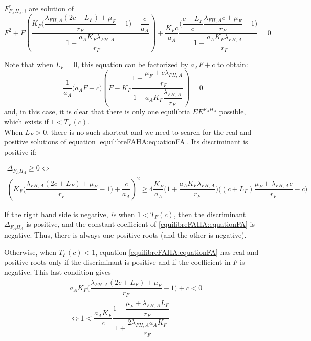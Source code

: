 \documentclass{article}
\newcommand{\lfa}{\lambda_{FH, A}}
\begin{document}
 $F^*_{F_AH_A, i}$ are solution of 
\begin{equation}
F^2 + F \left(\dfrac{K_F\Big(\dfrac{\lfa(2c+L_F) + \mu_F}{r_F} - 1\Big) + \dfrac{c}{a_A}}{1 + \dfrac{a_A K_F \lfa}{r_F}}  \right) + \dfrac{K_Fc}{a_A} \dfrac{\Big(\dfrac{c+L_F}{c} \dfrac{\lfa c + \mu_F}{r_F} - 1\Big)}{1 + \dfrac{a_A K_F \lfa}{r_F}} = 0
\label{equilibreFAHA:equationFA}
\end{equation}

Note that when $L_F = 0$, this equation can be factorized by $a_A F + c$ to obtain:
\begin{equation}
\dfrac{1}{a_A}\Big(a_A F + c\Big) \left(F - K_F \dfrac{1 - \dfrac{\mu_F + c \lfa}{r_F}}{1 + a_A K_F \dfrac{\lfa}{r_F}}\right) = 0
\label{equilibreFAHA:equationFA, LF = 0}
\end{equation}
and, in this case, it is clear that there is only one equilibria $EE^{F_AH_A}$ possible, which exists if $1 < T_F(c)$.
\\

When $L_F > 0$, there is no such shortcut and we need to search for the real and positive solutions of equation \eqref{equilibreFAHA:equationFA}. Its discriminant is positive if:

\begin{multline}
\Delta_{F_AH_A} \geq 0 \Leftrightarrow \\
\left(K_F \Big(\dfrac{\lfa(2c+L_F) + \mu_F}{r_F} - 1\Big) + \dfrac{c}{a_A} \right)^2 \geq  4 \dfrac{K_F}{a_A}  \Big(1 + \dfrac{a_A K_F \lfa}{r_F}\Big) \Big((c+L_F) \dfrac{\mu_F + \lfa c}{r_F} - c\Big)
\label{equilibreFAHA:discriminant2}
\end{multline}

If the right hand side is negative, \textit{ie} when $1< T_F(c)$, then the discriminant $\Delta_{F_AH_A}$ is positive, and the constant coefficient of \eqref{equilibreFAHA:equationFA} is negative. Thus, there is always one positive roots (and the other is negative).

Otherwise, when $T_F(c) < 1$, equation \eqref{equilibreFAHA:equationFA} has real and positive roots only if the discriminant is positive and if the coefficient in $F$ is negative. This last condition gives
\begin{subequations}
\begin{align}
& a_AK_F \Big(\dfrac{\lfa(2c+L_F) + \mu_F}{r_F}-1\Big) + c < 0 \\
& \Leftrightarrow 1 < \dfrac{a_AK_F}{c} \dfrac{1 - \dfrac{\mu_F + \lfa L_F}{r_F}}{1 + \dfrac{2 \lfa a_A K_F}{r_F}}
\end{align}
\end{subequations}
\end{document}
